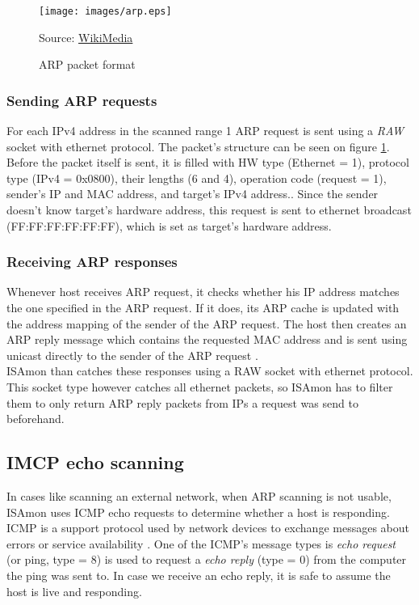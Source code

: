 \documentclass[11pt,a4paper]{article}
\newcommand{\source}[1]{\caption*{Source: {#1}} }
\begin{document}
		\begin{figure}[h]
			\centering
			\texttt{[image: images/arp.eps]}
			\caption{ARP packet format}
			\label{fig:arp}
			\source{\href{https://commons.wikimedia.org/wiki/Category:Address_Resolution_Protocol}{WikiMedia}}
		\end{figure}

		\subsubsection*{Sending ARP requests}
			For each IPv4 address in the scanned range 1 ARP request is sent using a \emph{RAW} socket with ethernet protocol. The packet's structure can be seen on figure \ref{fig:arp}. Before the packet itself is sent, it is filled with HW type (Ethernet = 1), protocol type (IPv4 = 0x0800), their lengths (6 and 4), operation code (request = 1), sender's IP and MAC address, and target's IPv4 address.\cite{Wiki:ARP}. Since the sender doesn't know target's hardware address, this request is sent to ethernet broadcast (FF:FF:FF:FF:FF:FF), which is set as target's hardware address.


		\subsubsection*{Receiving ARP responses}\label{section:arp_receiving}
			Whenever host receives ARP request, it checks whether his IP address matches the one specified in the ARP request. If it does, its ARP cache is updated with the address mapping of the sender of the ARP request. The host then creates an ARP reply message which contains the requested MAC address and is sent using unicast directly to the sender of the ARP request \cite{microsoft:arp_process}.\\
			ISAmon than catches these responses using a RAW socket with ethernet protocol. This socket type however catches all ethernet packets, so ISAmon has to filter them to only return ARP reply packets from IPs a request was send to beforehand.

	\subsection{IMCP echo scanning}
		In cases like scanning an external network, when ARP scanning is not usable, ISAmon uses ICMP echo requests to determine whether a host is responding. ICMP is a support protocol used by network devices to exchange messages about errors or service availability \cite{wiki:icmp}. One of the ICMP's message types is \emph{echo request} (or ping, type = 8) is used to request a \emph{echo reply} (type = 0) from the computer the ping was sent to. In case we receive an echo reply, it is safe to assume the host is live and responding.
\end{document}
